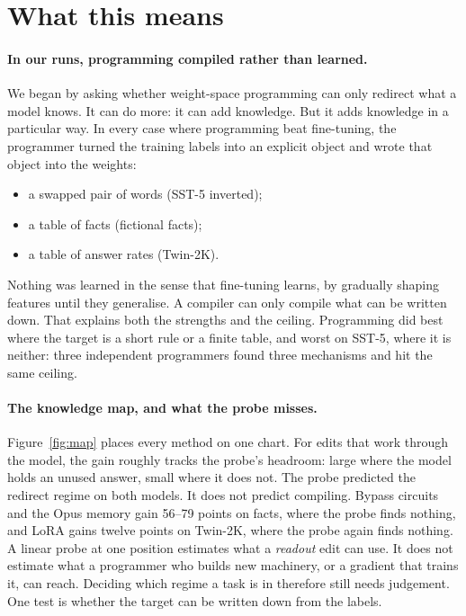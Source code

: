 \section{What this means}
\label{sec:discussion}

\paragraph{In our runs, programming compiled rather than learned.} We began by asking whether weight-space programming can only redirect what a model knows. It can do more: it can add knowledge. But it adds knowledge in a particular way. In every case where programming beat fine-tuning, the programmer turned the training labels into an explicit object and wrote that object into the weights:
\begin{itemize}
  \item a swapped pair of words (SST-5 inverted);
  \item a table of facts (fictional facts);
  \item a table of answer rates (Twin-2K).
\end{itemize}
Nothing was learned in the sense that fine-tuning learns, by gradually shaping features until they generalise. A compiler can only compile what can be written down. That explains both the strengths and the ceiling. Programming did best where the target is a short rule or a finite table, and worst on SST-5, where it is neither: three independent programmers found three mechanisms and hit the same ceiling.

\paragraph{The knowledge map, and what the probe misses.} Figure~\ref{fig:map} places every method on one chart. For edits that work through the model, the gain roughly tracks the probe's headroom: large where the model holds an unused answer, small where it does not. The probe predicted the redirect regime on both models. It does not predict compiling. Bypass circuits and the Opus memory gain 56--79 points on facts, where the probe finds nothing, and LoRA gains twelve points on Twin-2K, where the probe again finds nothing. A linear probe at one position estimates what a \emph{readout} edit can use. It does not estimate what a programmer who builds new machinery, or a gradient that trains it, can reach. Deciding which regime a task is in therefore still needs judgement. One test is whether the target can be written down from the labels.

